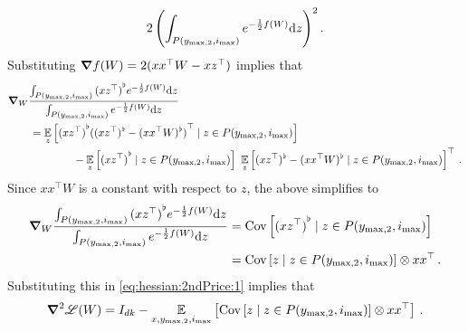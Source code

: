 \documentclass[11pt,letterpaper]{article}
\theoremstyle{plain}
\theoremstyle{definition}
\theoremstyle{remark}
\newcommand{\sinparen}[1]{\ensuremath{(#1)}}
\newcommand{\inparen}[1]{\ensuremath{\left(#1\right)}}
\newcommand{\insquare}[1]{\ensuremath{\left[#1\right]}}
\newcommand{\E}{\operatornamewithlimits{\mathbb{E}}}
\newcommand{\Ex}{\E}
\newcommand{\Cov}{\ensuremath{\operatornamewithlimits{\rm Cov}}}
\newcommand{\customcal}[1]{\euscr{#1}}
\newcommand{\cL}{\customcal{L}}
\newcommand{\negLL}{\ensuremath{\mathscr{L}}}
\renewcommand{\d}{{\rm d}}
\renewcommand{\cL}{\negLL}
\newcommand{\smax}{\max,2} %
\newcommand{\imax}{i_{\max}}
\newcommand{\ysmax}{y_{\smax}}
\begin{document}
{{{\begin{align*}
{           }{
                2\inparen{\int_{P({\ysmax,\imax})} e^{-\frac{1}{2}f(W)} \d z }^2
           }
           \,.
        \end{align*}
        Substituting $\grad f(W) = 2(xx^\top W- xz^\top)$ implies that 
        \begin{align*}
           &\grad_W \frac{
            \int_{P({\ysmax,\imax})} {(xz^\top)}^\flat e^{-\frac{1}{2}f(W)} \d z 
           }{
            \int_{P({\ysmax,\imax})} e^{-\frac{1}{2}f(W)} \d z 
           }\\
           &\qquad= 
           \Ex_z\insquare{{(xz^\top)}^\flat {\sinparen{(xz^\top)^\flat - (xx^\top W)^\flat}}^\top \mid z\in P({\ysmax,\imax})}\\
           &\qquad\qquad\qquad - \Ex_z \insquare{
                {(xz^\top)}^\flat \mid z\in P({\ysmax,\imax})
            }
           ~\Ex_z\insquare{
                (xz^\top)^\flat - (xx^\top W)^\flat
                \mid z\in P({\ysmax,\imax})
           }^\top\,.
        \end{align*}
        Since $xx^\top W$ is a constant with respect to $z$, the above simplifies to 
        \begin{align*}
            \grad_W \frac{
             \int_{P({\ysmax,\imax})} {(xz^\top)}^\flat e^{-\frac{1}{2}f(W)} \d z 
            }{
             \int_{P({\ysmax,\imax})} e^{-\frac{1}{2}f(W)} \d z 
            }
            &= \Cov\insquare{{(xz^\top)}^\flat\mid z\in P({\ysmax,\imax})}\\
            &= \Cov\insquare{z\mid z\in P({\ysmax,\imax})}\otimes xx^\top
            \,.
        \end{align*}
        Substituting this in \cref{eq:hessian:2ndPrice:1} implies that 
        \[
            \grad^2 \cL(W) =  I_{dk} 
                - \Ex_{{x,\ysmax,\imax}}\insquare{\Cov\insquare{z\mid z\in P({\ysmax,\imax})}\otimes xx^\top}\,.
        \]

    

}}}
\end{document}
